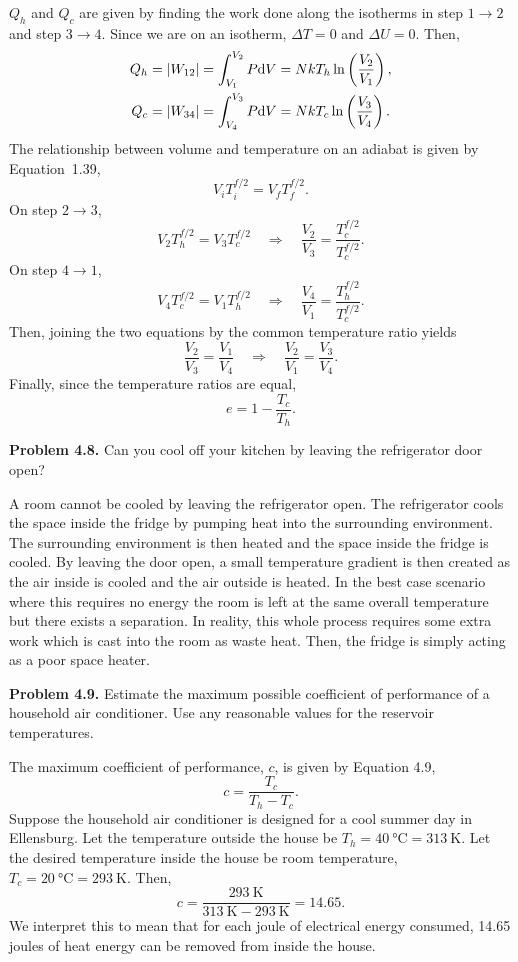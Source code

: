 \documentclass[a4paper, 12pt]{config/homework}
\begin{document}
\bigskip\noindent
\(Q_h\) and \(Q_c\) are given by finding the work done along the isotherms in step \(1\to 2\) and step \(3\to 4\). Since we are on an isotherm, \(\Delta T = 0\) and \(\Delta U = 0\). Then,
\begin{align*}
Q_h &= \left|W_{12}\right| = \int_{V_1}^{V_2}{P \text{d}V} = NkT_h \ln\left(\frac{V_2}{V_1}\right), \\
Q_c &= \left|W_{34}\right| = \int_{V_4}^{V_3}{P \text{d}V} = NkT_c \ln\left(\frac{V_3}{V_4}\right).
\end{align*}
The relationship between volume and temperature on an adiabat is given by Equation~1.39,
\[V_i T_i^{f/2} = V_f T_f^{f/2}.\]
On step \(2\to 3\),
\[V_2 T_h^{f/2} = V_3 T_c^{f/2} \quad\Rightarrow\quad \frac{V_2}{V_3}=\frac{T_c^{f/2}}{T_c^{f/2}}.\]
On step \(4\to 1\),
\[V_4 T_c^{f/2} = V_1 T_h^{f/2} \quad\Rightarrow\quad \frac{V_4}{V_1} = \frac{T_h^{f/2}}{T_c^{f/2}}.\]
Then, joining the two equations by the common temperature ratio yields
\[\frac{V_2}{V_3}=\frac{V_1}{V_4} \quad\Rightarrow\quad \frac{V_2}{V_1} = \frac{V_3}{V_4}.\]
Finally, since the temperature ratios are equal,
\[e = 1 - \frac{T_c}{T_h}.\]

\bigskip\noindent
\textbf{Problem 4.8.} Can you cool off your kitchen by leaving the refrigerator door open?

\bigskip\noindent
A room cannot be cooled by leaving the refrigerator open. The refrigerator cools the space inside the fridge by pumping heat into the surrounding environment. The surrounding environment is then heated and the space inside the fridge is cooled. By leaving the door open, a small temperature gradient is then created as the air inside is cooled and the air outside is heated. In the best case scenario where this requires no energy the room is left at the same overall temperature but there exists a separation. In reality, this whole process requires some extra work which is cast into the room as waste heat. Then, the fridge is simply acting as a poor space heater.

\pagebreak\noindent
\textbf{Problem 4.9.} Estimate the maximum possible coefficient of performance of a household air conditioner. Use any reasonable values for the reservoir temperatures.

\bigskip\noindent
The maximum coefficient of performance, \(c\), is given by Equation 4.9,
\[c = \frac{T_c}{T_h - T_c}.\]
Suppose the household air conditioner is designed for a cool summer day in Ellensburg. Let the temperature outside the house be \(T_h=\qty{40}{\celsius}=\qty{313}{\kelvin}\). Let the desired temperature inside the house be room temperature, \(T_c=\qty{20}{\celsius}=\qty{293}{\kelvin}\). Then,
\[c = \frac{\qty{293}{\kelvin}}{\qty{313}{\kelvin} - \qty{293}{\kelvin}} = 14.65.\]
We interpret this to mean that for each joule of electrical energy consumed, 14.65 joules of heat energy can be removed from inside the house.
\end{document}
